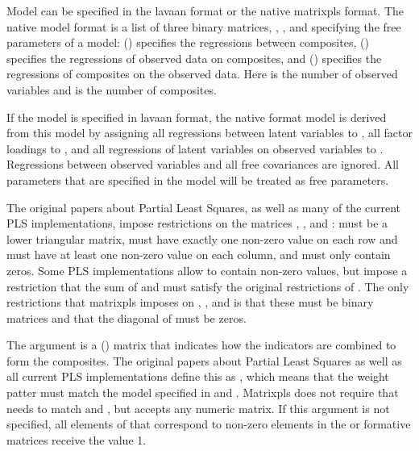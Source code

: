 \documentclass[a4paper]{book}
\begin{document}
\begin{Details}\relax
Model can be specified in the lavaan format or the native matrixpls format.
The native model format is a list of three binary matrices, , ,
and  specifying the free parameters of a model:  () specifies the 
regressions between composites,  () specifies the regressions of observed
data on composites, and  () specifies the regressions of composites on the
observed data. Here  is the number of observed variables and  is the number of composites.

If the model is specified in lavaan format, the native
format model is derived from this model by assigning all regressions between latent
variables to , all factor loadings to , and all regressions
of latent variables on observed variables to . Regressions between
observed variables and all free covariances are ignored. All parameters that are
specified in the model will be treated as free parameters.

The original papers about Partial Least Squares, as well as many of the current PLS
implementations, impose restrictions on the matrices ,
, and :  must be a lower triangular matrix,
 must have exactly one non-zero value on each row and must have at least
one non-zero value on each column, and  must only contain zeros.
Some PLS implementations allow  to contain non-zero values, but impose a
restriction that the sum of  and  must satisfy
the original restrictions of . The only restrictions that matrixpls
imposes on , , and  is that these must be
binary matrices and that the diagonal of  must be zeros.

The argument  is a () matrix that indicates
how the indicators are combined to form the composites. The original papers about
Partial Least Squares as well as all current PLS implementations define this as
, which means that the weight patter must match the
model specified in  and . Matrixpls does not
require that  needs to match  and , but
accepts any numeric matrix. If this argument is not specified, all elements of  that
correspond to non-zero elements in the  or  formative
matrices receive the value 1.


\end{Details}
\end{document}
